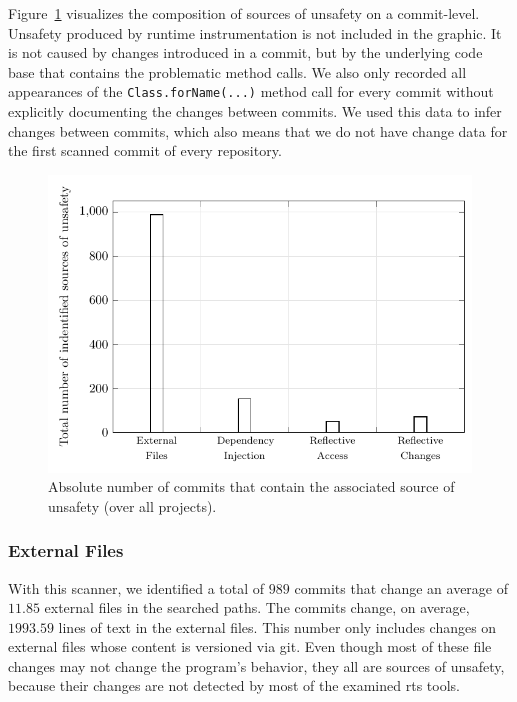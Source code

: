 Figure~\ref{fig:probs_commits} visualizes the composition of sources of unsafety on a commit-level.
Unsafety produced by runtime instrumentation is not included in the graphic. It is
not caused by changes introduced in a commit, but by the underlying code base that contains the
problematic method calls. We also only recorded all appearances of the \texttt{Class.forName(...)}
method call for every commit without explicitly documenting the changes between commits. We used
this data to infer changes between commits, which also means that we do not have change data for
the first scanned commit of every repository.

\begin{figure}[h]
    \caption{Absolute number of commits that contain the associated source of unsafety (over all projects).}\label{fig:probs_commits}
    \centering
    \vspace{2em}
    \includegraphics[scale=0.7]{./figures/pdf/commit_bar.pdf}
\end{figure}

\subsubsection{External Files}
With this scanner, we identified a total of $989$ commits that change an average of
$11.85$ external files in the searched paths. The commits change, on average, $1993.59$ lines of
text in the external files. This number only includes changes on external files whose content is
versioned via git. Even though most of these file changes may not change the program's behavior,
they all are sources of unsafety, because their changes are not detected by most of the examined
\ac{rts} tools.

